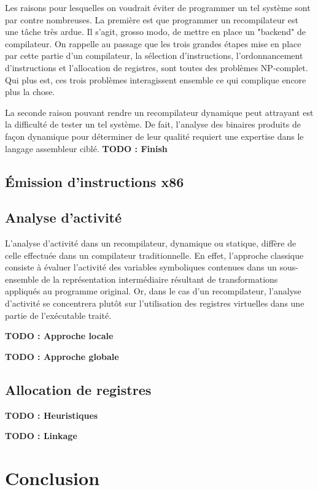 \documentclass{article} %
\begin{document}
Les raisons pour lesquelles on voudrait éviter de programmer un tel système sont par contre nombreuses. La première est que programmer un recompilateur est une tâche très ardue. Il s'agit, grosso modo, de mettre en place un "backend" de compilateur. On rappelle au passage que les trois grandes étapes mise en place par cette partie d'un compilateur, la sélection d'instructions, l'ordonnancement d'instructions et l'allocation de registres, sont toutes des problèmes NP-complet. Qui plus est, ces trois problèmes interagissent ensemble ce qui complique encore plus la chose. 

La seconde raison pouvant rendre un recompilateur dynamique peut attrayant est la difficulté de tester un tel système. De fait, l'analyse des binaires produits de façon dynamique pour déterminer de leur qualité requiert une expertise dans le langage assembleur ciblé. \textbf{TODO : Finish}

\subsection{Émission d'instructions x86}

\subsection{Analyse d'activité}
L'analyse d'activité dans un recompilateur, dynamique ou statique, diffère de celle effectuée dans un compilateur traditionnelle. En effet, l'approche classique consiste à évaluer l'activité des variables symboliques contenues dans un sous-ensemble de la représentation intermédiaire résultant de transformations appliqués au programme original. Or, dans le cas d'un recompilateur, l'analyse d'activité se concentrera plutôt sur l'utilisation des registres virtuelles dans une partie de l'exécutable traité.

\textbf{TODO : Approche locale}

\textbf{TODO : Approche globale}

\subsection{Allocation de registres}

\textbf{TODO : Heuristiques}

\textbf{TODO : Linkage}

\section{Conclusion}
\end{document}
